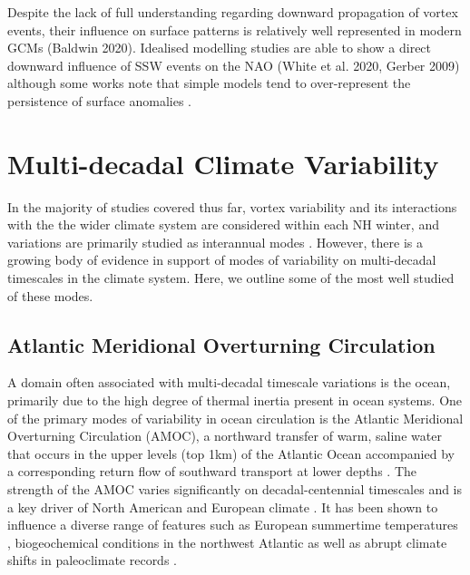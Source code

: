 {Despite the lack of full understanding regarding downward propagation of vortex events, their influence on surface patterns is relatively well represented in modern GCMs (Baldwin 2020). Idealised modelling studies are able to show a direct downward influence of SSW events on the NAO (White et al. 2020, Gerber 2009) although some works note that simple models tend to over-represent the persistence of surface anomalies \citep{gerberAnnular2008, gerberTesting2008}. 

\section{Multi-decadal Climate Variability}
\label{sec:multi-decadal_background}
In the majority of studies covered thus far, vortex variability and its interactions with the the wider climate system are considered within each NH winter, and variations are primarily studied as interannual modes . However, there is a growing body of evidence in support of modes of variability on multi-decadal timescales in the climate system. Here, we outline some of the most well studied of these modes. 

\subsection{Atlantic Meridional Overturning Circulation}
A domain often associated with multi-decadal timescale variations is the ocean, primarily due to the high degree of thermal inertia present in ocean systems. One of the primary modes of variability in ocean circulation is the Atlantic Meridional Overturning Circulation (AMOC), a northward transfer of warm, saline water that occurs in the upper levels (top 1km) of the Atlantic Ocean accompanied by a corresponding return flow of southward transport at lower depths \citep{kuhlbrodtDriving2007, xuIntraseasonal2014}. The strength of the AMOC varies significantly on decadal-centennial timescales \citep{delworthInterdecadal1993, biastochCauses2008a, tullochExploring2012, menaryMultimodel2012} and is a key driver of North American and European climate \citep{knightSignature2005, delworthObserved2000, friersonContribution2013, frankignoulInfluence2013}. It has been shown to influence a diverse range of features such as European summertime temperatures \citep{suttonAtlantic2005}, biogeochemical conditions in the northwest Atlantic \citep{lavoieProjections2019} as well as abrupt climate shifts in paleoclimate records \citep{alleyWally2007a, chengIce2009a}.

}
